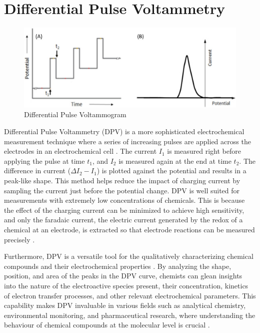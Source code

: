 \section{Differential Pulse Voltammetry}
\begin{figure}[h!]
  \centering
    \includegraphics[width=1.0\textwidth]{figures/dpv.jpg}
    \caption{Differential Pulse Voltammogram}
    \label{dpv_example}
\end{figure}
Differential Pulse Voltammetry (DPV) is a more sophisticated electrochemical measurement technique where a series of increasing pulses are applied across the electrodes in an electrochemical cell \cite{Scholz2005-pa}. The current $I_1$ is measured right before applying the pulse at time $t_1$, and $I_2$ is measured again at the end at time $t_2$. The difference in current ($\Delta I_2 - I_1$) is plotted against the potential and results in a peak-like shape. 
This method helps reduce the impact of charging current by sampling the current just before the potential change. DPV is well suited for measurements with extremely low concentrations of chemicals. This is because the effect of the charging current can be minimized to achieve high sensitivity, and only the faradaic current, the electric current generated by the redox of a chemical at an electrode, is extracted so that electrode reactions can be measured precisely \cite{Laborda2014}. 

Furthermore, DPV is a versatile tool for the qualitatively characterizing chemical compounds and their electrochemical properties \cite{Scholz2005-pa}. By analyzing the shape, position, and area of the peaks in the DPV curve, chemists can glean insights into the nature of the electroactive species present, their concentration, kinetics of electron transfer processes, and other relevant electrochemical parameters. This capability makes DPV invaluable in various fields such as analytical chemistry, environmental monitoring, and pharmaceutical research, where understanding the behaviour of chemical compounds at the molecular level is crucial \cite{Scholz2005-pa}.